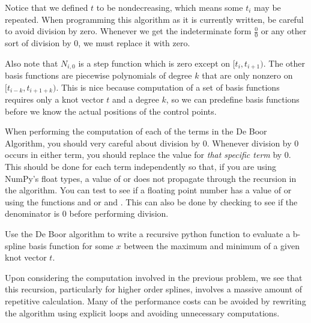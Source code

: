 Notice that we defined $t$ to be nondecreasing, which means some $t_i$ may be repeated.
When programming this algorithm as it is currently written, be careful to avoid division by zero.
Whenever we get the indeterminate form $\frac{0}{0}$ or any other sort of division by $0$, we must replace it with zero.

Also note that $N_{i,0}$ is a step function which is zero except on $[t_i, t_{i+1})$.
The other basis functions are piecewise polynomials of degree $k$ that are only nonzero on $[t_{i-k}, t_{i+1+k})$.
This is nice because computation of a set of basis functions requires only a knot vector $t$ and a degree $k$, so we can predefine basis functions before we know the actual positions of the control points.

\begin{warn}
When performing the computation of each of the terms in the De Boor Algorithm, you should very careful about division by $0$.
Whenever division by $0$ occurs in either term, you should replace the value for \emph{that specific term} by $0$.
This should be done for each term independently so that, if you are using NumPy's float types, a value of  or  does not propagate through the recursion in the algorithm.
You can test to see if a floating point number has a value of  or  using the functions  and  or  and .
This can also be done by checking to see if the denominator is $0$ before performing division.
\end{warn}

\begin{problem}
Use the De Boor algorithm to write a recursive python function to evaluate a b-spline basis function for some $x$ between the maximum and minimum of a given knot vector $t$.
\end{problem}

Upon considering the computation involved in the previous problem, we see that this recursion, particularly for higher order splines, involves a massive amount of repetitive calculation.
Many of the performance costs can be avoided by rewriting the algorithm using explicit loops and avoiding unnecessary computations.

